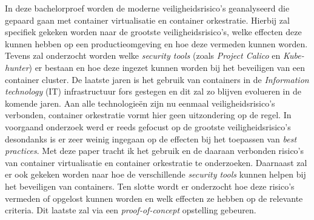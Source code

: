 In deze bachelorproef worden de moderne veiligheidsrisico’s geanalyseerd die gepaard gaan met container virtualisatie en container orkestratie. Hierbij zal specifiek gekeken worden naar de grootste veiligheidsrisico’s, welke effecten deze kunnen hebben op een productieomgeving en hoe deze vermeden kunnen worden. Tevens zal onderzocht worden welke \textit{security tools} (zoals \textit{Project Calico} en \textit{Kube-hunter}) er bestaan en hoe deze ingezet kunnen worden bij het beveiligen van een container cluster. De laatste jaren is het gebruik van containers in de \textit{Information technology} (IT) infrastructuur fors gestegen en dit zal zo blijven evolueren in de komende jaren. Aan alle technologieën zijn nu eenmaal veiligheidsrisico’s verbonden, container orkestratie vormt hier geen uitzondering op de regel. In voorgaand onderzoek werd er reeds gefocust op de grootste veiligheidsrisico’s desondanks is er zeer weinig ingegaan op de effecten bij het toepassen van \textit{best practices}. Met deze paper tracht ik het gebruik en de daaraan verbonden risico’s van container virtualisatie en container orkestratie te onderzoeken. Daarnaast zal er ook gekeken worden naar hoe de verschillende \textit{security tools} kunnen helpen bij het beveiligen van containers. Ten slotte wordt er onderzocht hoe deze risico’s vermeden of opgelost kunnen worden en welk effecten ze hebben op de relevante criteria. Dit laatste zal via een \textit{proof-of-concept} opstelling gebeuren.
